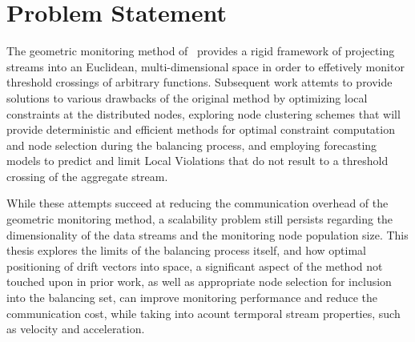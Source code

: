 \chapter{Problem Statement} \label{chap:probStatement}

The geometric monitoring method of~\cite{Sharfman2006GM} provides a rigid framework of projecting streams into an Euclidean, multi-dimensional space in order to effetively monitor threshold crossings of arbitrary functions. Subsequent work attemts to provide solutions to various drawbacks of the original method by optimizing local constraints at the distributed nodes, exploring node clustering schemes that will provide deterministic and efficient methods for optimal constraint computation and node selection during the balancing process, and employing forecasting models to predict and limit Local Violations that do not result to a threshold crossing of the aggregate stream.

While these attempts succeed at reducing the communication overhead of the geometric monitoring method, a scalability problem still persists regarding the dimensionality of the data streams and the monitoring node population size. This thesis explores the limits of the balancing process itself, and how optimal positioning of drift vectors into space, a significant aspect of the method not touched upon in prior work, as well as appropriate node selection for inclusion into the balancing set, can improve monitoring performance and reduce the communication cost, while taking into acount termporal stream properties, such as velocity and acceleration.
